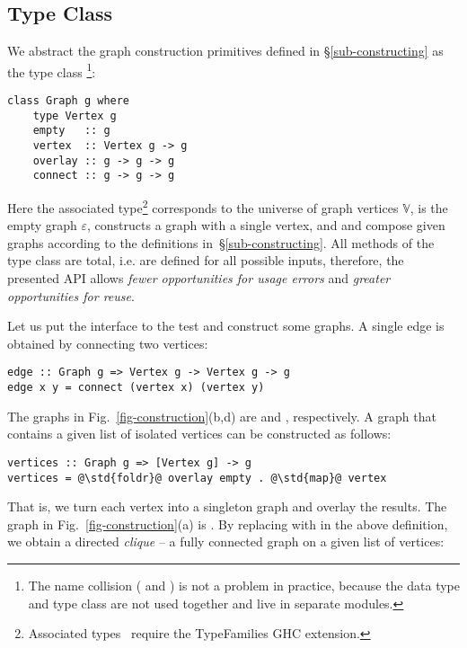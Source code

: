 \subsection{Type Class}\label{sub-class}

We abstract the graph construction primitives defined in \S\ref{sub-constructing}
as the type class \footnote{The name collision (
and ) is not a problem in practice, because the data type and type class
are not used together and live in separate modules.}:

\begin{verbatim}
class Graph g where
    type Vertex g
    empty   :: g
    vertex  :: Vertex g -> g
    overlay :: g -> g -> g
    connect :: g -> g -> g
\end{verbatim}

\noindent
Here the associated type\footnote{Associated
types~\cite{2005_associated_type_chakravarty} require the \textsf{TypeFamilies}
GHC extension.}  corresponds to the universe of graph
vertices $\mathbb{V}$,  is the empty graph
$\varepsilon$,  constructs a graph with a single vertex,
and  and  compose given graphs according to
the definitions in~\S\ref{sub-constructing}. All methods of the type class
are total, i.e. are defined for all possible inputs, therefore,
the presented API allows \emph{fewer opportunities for usage errors}
and \emph{greater opportunities for reuse}.

Let us put the interface to the test and construct some graphs. A single edge is
obtained by connecting two vertices:

\begin{verbatim}
edge :: Graph g => Vertex g -> Vertex g -> g
edge x y = connect (vertex x) (vertex y)
\end{verbatim}

\noindent
The graphs in Fig.~\ref{fig-construction}(b,d) are  and
, respectively.
A graph that contains a given list of isolated vertices can be constructed
as follows:

\begin{verbatim}
vertices :: Graph g => [Vertex g] -> g
vertices = @\std{foldr}@ overlay empty . @\std{map}@ vertex
\end{verbatim}

\noindent
That is, we turn each vertex into a singleton graph and overlay the results.
The graph in Fig.~\ref{fig-construction}(a) is .
By replacing  with  in the above
definition, we obtain a directed \emph{clique} -- a fully connected graph
on a given list of vertices:

